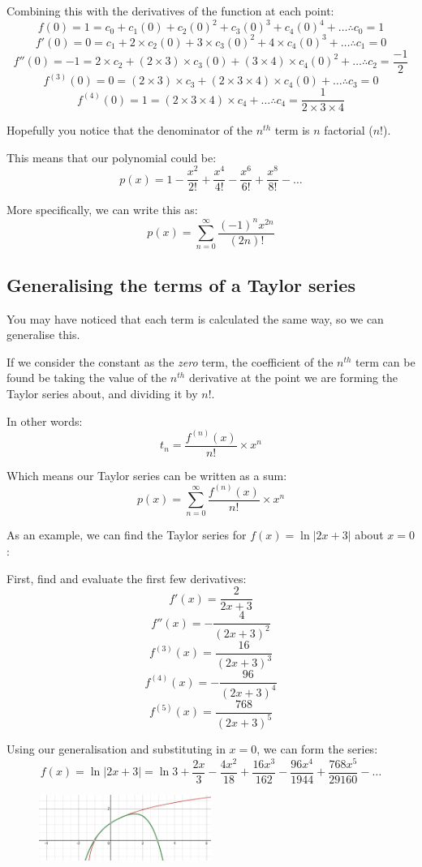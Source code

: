 \documentclass[../main.tex]{subfiles}
\begin{document}
Combining this with the derivatives of the function at each point:
\[f(0) = 1 = c_0 + c_1(0) + c_2(0)^2 + c_3(0)^3 + c_4(0)^4 + \dots \therefore c_0 = 1\]
\[f'(0) = 0 = c_1 + 2\times c_2(0) + 3\times c_3(0)^2 + 4\times c_4(0)^3 + \dots \therefore c_1 = 0\]
\[f''(0) = -1 = 2\times c_2 + (2\times 3)\times c_3(0) + (3\times 4)\times c_4(0)^2 + \dots \therefore c_2 = \frac{-1}{2}\]
\[f^{(3)}(0) = 0 = (2\times 3)\times c_3 + (2\times 3\times 4)\times c_4(0) + \dots \therefore c_3 = 0\]
\[f^{(4)}(0) = 1 = (2\times 3\times 4)\times c_4 + \dots \therefore c_4 = \frac{1}{2\times 3\times 4}\]

Hopefully you notice that the denominator of the $n^{th}$ term is $n$ factorial ($n!$).

This means that our polynomial could be:
\[p(x) = 1 - \frac{x^2}{2!} +\frac{x^4}{4!} - \frac{x^6}{6!} + \frac{x^8}{8!} - \dots\]

More specifically, we can write this as:
\[p(x) = \sum_{n=0}^{\infty} \frac{(-1)^{n}x^{2n}}{(2n)!}\]

\subsection*{Generalising the terms of a Taylor series}
You may have noticed that each term is calculated the same way, so we can generalise this.

If we consider the constant as the \textit{zero} term, the coefficient of the $n^{th}$ term can be found be taking the value of the $n^{th}$ derivative at the point we are forming the Taylor series about, and dividing it by $n!$.

In other words:
\[t_n = \frac{f^{(n)}(x)}{n!}\times x^n\]

Which means our Taylor series can be written as a sum:
\[p(x) = \sum_{n=0}^{\infty} \frac{f^{(n)}(x)}{n!}\times x^n\]

As an example, we can find the Taylor series for $f(x)=\ln{|2x+3|}$ about $x=0$:

First, find and evaluate the first few derivatives:
\[f'(x) = \frac{2}{2x+3}\]
\[f''(x) = -\frac{4}{(2x+3)^2}\]
\[f^{(3)}(x) = \frac{16}{(2x+3)^3}\]
\[f^{(4)}(x) = -\frac{96}{(2x+3)^4}\]
\[f^{(5)}(x) = \frac{768}{(2x+3)^5} \]

Using our generalisation and substituting in $x=0$, we can form the series:
\[f(x) = \ln{|2x+3|} = \ln{3} + \frac{2x}{3} - \frac{4x^2}{18} + \frac{16x^3}{162} - \frac{96x^4}{1944} + \frac{768x^5}{29160} - \dots\]

\begin{figure}[h]
    \centering
    \includegraphics[width=0.5\textwidth]{images/taylorseries10.png}
\end{figure}
\end{document}

